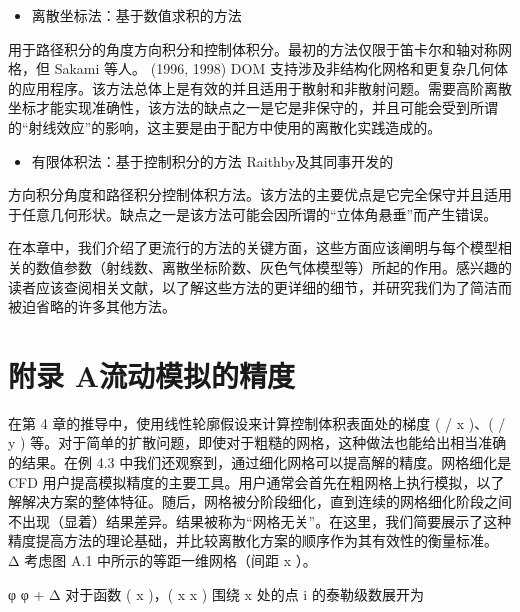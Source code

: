 \documentclass[11pt,a4paper,openany,fontset=none]{ctexbook}
\begin{document}
\begin{itemize}

\item 离散坐标法：基于数值求积的方法

\end{itemize}

用于路径积分的角度方向积分和控制体积分。最初的方法仅限于笛卡尔和轴对称网格，但 Sakami 等人。 (1996, 1998) DOM 支持涉及非结构化网格和更复杂几何体的应用程序。该方法总体上是有效的并且适用于散射和非散射问题。需要高阶离散坐标才能实现准确性，该方法的缺点之一是它是非保守的，并且可能会受到所谓的“射线效应”的影响，这主要是由于配方中使用的离散化实践造成的。

\begin{itemize}

\item 有限体积法：基于控制积分的方法
Raithby及其同事开发的

\end{itemize}

方向积分角度和路径积分控制体积方法。该方法的主要优点是它完全保守并且适用于任意几何形状。缺点之一是该方法可能会因所谓的“立体角悬垂”而产生错误。

在本章中，我们介绍了更流行的方法的关键方面，这些方面应该阐明与每个模型相关的数值参数（射线数、离散坐标阶数、灰色气体模型等）所起的作用。感兴趣的读者应该查阅相关文献，以了解这些方法的更详细的细节，并研究我们为了简洁而被迫省略的许多其他方法。

\chapter*{附录 A\quad 流动模拟的精度}



在第 4 章的推导中，使用线性轮廓假设来计算控制体积表面处的梯度 ( / x )、( / y ) 等。对于简单的扩散问题，即使对于粗糙的网格，这种做法也能给出相当准确的结果。在例 4.3 中我们还观察到，通过细化网格可以提高解的精度。网格细化是 CFD 用户提高模拟精度的主要工具。用户通常会首先在粗网格上执行模拟，以了解解决方案的整体特征。随后，网格被分阶段细化，直到连续的网格细化阶段之间不出现（显着）结果差异。结果被称为“网格无关”。在这里，我们简要展示了这种精度提高方法的理论基础，并比较离散化方案的顺序作为其有效性的衡量标准。 Δ 考虑图 A.1 中所示的等距一维网格（间距 x ）。

φ φ + Δ 对于函数 ( x )，( x x ) 围绕 x 处的点 i 的泰勒级数展开为
\end{document}
